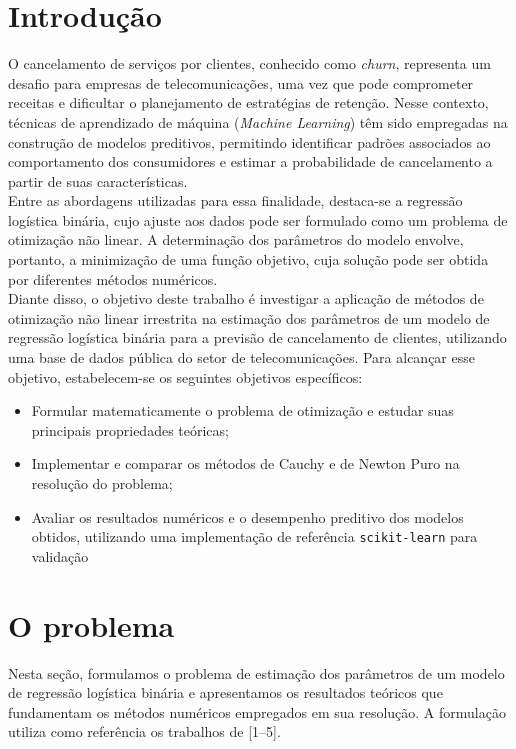 \documentclass{article}
\theoremstyle{remark}
\begin{document}
\pagestyle{empty}

\newpage
\section{Introdução}

O cancelamento de serviços por clientes, conhecido como \textit{churn}, representa um desafio para empresas de telecomunicações, uma vez que pode comprometer receitas e dificultar o planejamento de estratégias de retenção. Nesse contexto, técnicas de aprendizado de máquina (\textit{Machine Learning}) têm sido empregadas na construção de modelos preditivos, permitindo identificar padrões associados ao comportamento dos consumidores e estimar a probabilidade de cancelamento a partir de suas características.\\

Entre as abordagens utilizadas para essa finalidade, destaca-se a regressão logística binária, cujo ajuste aos dados pode ser formulado como um problema de otimização não linear. A determinação dos parâmetros do modelo envolve, portanto, a minimização de uma função objetivo, cuja solução pode ser obtida por diferentes métodos numéricos.\\

Diante disso, o objetivo deste trabalho é investigar a aplicação de métodos de otimização não linear irrestrita na estimação dos parâmetros de um modelo de regressão logística binária para a previsão de cancelamento de clientes, utilizando uma base de dados pública do setor de telecomunicações. Para alcançar esse objetivo, estabelecem-se os seguintes objetivos específicos:

\begin{itemize}
    \item Formular matematicamente o problema de otimização e estudar suas principais propriedades teóricas;
    \item Implementar e comparar os métodos de Cauchy e de Newton Puro na resolução do problema;
    \item Avaliar os resultados numéricos e o desempenho preditivo dos modelos obtidos, utilizando uma implementação de referência \texttt{scikit-learn} para validação 
\end{itemize}

\section{O problema}

Nesta seção, formulamos o problema de estimação dos parâmetros de um modelo de regressão logística binária e apresentamos os resultados teóricos que fundamentam os métodos numéricos empregados em sua resolução. A formulação utiliza como referência os trabalhos de [1--5].
\end{document}
